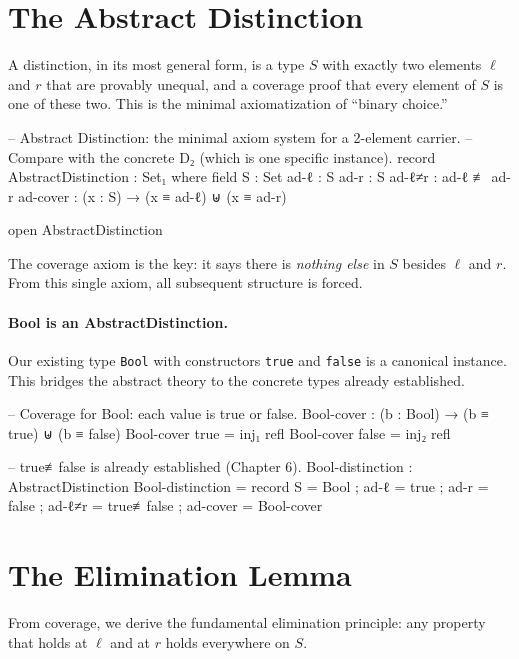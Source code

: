 \documentclass[11pt,a4paper]{book}
\begin{document}
\section{The Abstract Distinction}

A distinction, in its most general form, is a type $S$ with exactly two elements
$\ell$ and $r$ that are provably unequal, and a coverage proof that every element
of $S$ is one of these two. This is the minimal axiomatization of ``binary choice.''

\begin{code}
-- Abstract Distinction: the minimal axiom system for a 2-element carrier.
-- Compare with the concrete D₂ (which is one specific instance).
record AbstractDistinction : Set₁ where
  field
    S     : Set
    ad-ℓ  : S
    ad-r  : S
    ad-ℓ≠r : ad-ℓ ≢ ad-r
    ad-cover : (x : S) → (x ≡ ad-ℓ) ⊎ (x ≡ ad-r)

open AbstractDistinction
\end{code}

The coverage axiom is the key: it says there is \emph{nothing else} in $S$ besides
$\ell$ and $r$. From this single axiom, all subsequent structure is forced.

\paragraph{Bool is an AbstractDistinction.}
Our existing type \texttt{Bool} with constructors \texttt{true} and \texttt{false}
is a canonical instance. This bridges the abstract theory to the concrete types
already established.

\begin{code}
-- Coverage for Bool: each value is true or false.
Bool-cover : (b : Bool) → (b ≡ true) ⊎ (b ≡ false)
Bool-cover true  = inj₁ refl
Bool-cover false = inj₂ refl

-- true≢false is already established (Chapter 6).
Bool-distinction : AbstractDistinction
Bool-distinction = record
  { S      = Bool
  ; ad-ℓ   = true
  ; ad-r   = false
  ; ad-ℓ≠r = true≢false
  ; ad-cover = Bool-cover
  }
\end{code}

\section{The Elimination Lemma}

From coverage, we derive the fundamental elimination principle: any property that
holds at $\ell$ and at $r$ holds everywhere on $S$.
\end{document}
